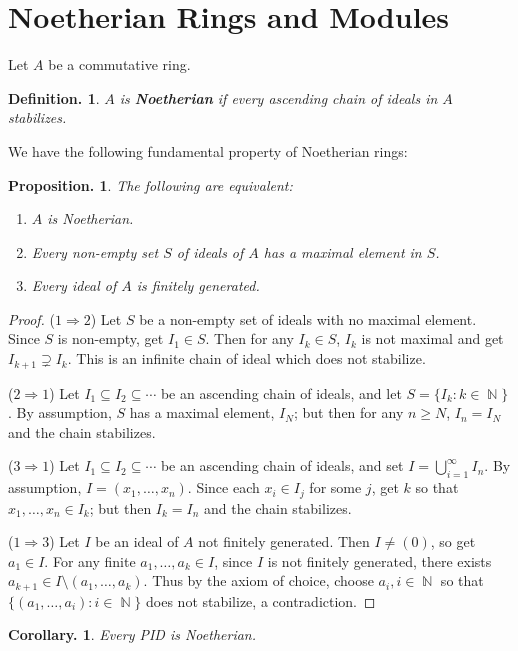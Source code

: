 \documentclass[11pt, a4paper]{memoir}
\DeclareMathOperator{\N}{{\mathbb{N}}}
\newcommand{\imp}[2]{($#1\Rightarrow#2$)\hspace{0.2cm}}
\theoremstyle{change}
\newtheorem{corollary}[theorem]{Corollary.}
\newtheorem{proposition}[theorem]{Proposition.}
\theoremstyle{plain}
\theoremstyle{nonumberplain}
\newtheorem{definition}{Definition.}
\newtheorem{proof}{Proof}
\numberwithin{equation}{section}
\begin{document}
\section{Noetherian Rings and Modules}
Let $A$ be a commutative ring.
\begin{definition}
    $A$ is \textbf{Noetherian} if every ascending chain of ideals in $A$ stabilizes.
\end{definition}
We have the following fundamental property of Noetherian rings:
\begin{proposition}\label{noe}
    The following are equivalent:
    \begin{enumerate}[nolistsep]
        \item $A$ is Noetherian.
        \item Every non-empty set $S$ of ideals of $A$ has a maximal element in $S$.
        \item Every ideal of $A$ is finitely generated.
    \end{enumerate}
\end{proposition}
\begin{proof}
    \imp{1}{2}
    Let $S$ be a non-empty set of ideals with no maximal element.
    Since $S$ is non-empty, get $I_1\in S$.
    Then for any $I_k\in S$, $I_k$ is not maximal and get $I_{k+1}\supsetneq I_k$.
    This is an infinite chain of ideal which does not stabilize.

    \imp{2}{1}
    Let $I_1\subseteq I_2\subseteq\cdots$ be an ascending chain of ideals, and let $S=\{I_k:k\in\N\}$.
    By assumption, $S$ has a maximal element, $I_N$; but then for any $n\geq N$, $I_n=I_N$ and the chain stabilizes.

    \imp{3}{1}
    Let $I_1\subseteq I_2\subseteq\cdots$ be an ascending chain of ideals, and set $I=\bigcup_{i=1}^\infty I_n$.
    By assumption, $I=(x_1,\ldots,x_n)$.
    Since each $x_i\in I_j$ for some $j$, get $k$ so that $x_1,\ldots,x_n\in I_k$; but then $I_k=I_n$ and the chain stabilizes.

    \imp{1}{3}
    Let $I$ be an ideal of $A$ not finitely generated.
    Then $I\neq(0)$, so get $a_1\in I$.
    For any finite $a_1,\ldots,a_k\in I$, since $I$ is not finitely generated, there exists $a_{k+1}\in I\setminus(a_1,\ldots,a_k)$.
    Thus by the axiom of choice, choose $a_i,i\in\N$ so that $\{(a_1,\ldots,a_i):i\in\N\}$ does not stabilize, a contradiction.
\end{proof}
\begin{corollary}
    Every PID is Noetherian.
\end{corollary}
\end{document}
